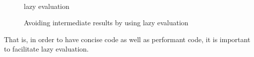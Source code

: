\documentclass[12pt,a4paper,oneside,openright]{book}
\newcommand{\Ie}{That is, }
\begin{document}
\begin{CJK}{UTF8}{}
\begin{figure}[htbp]
\begin{center}
\begin{minipage}[t]{.336940298507463\textwidth}
     \end{minipage}
     \hspace{1cm}
     \begin{minipage}[t]{.263059701492537\textwidth} %
       \begin{center}
         \\
         lazy evaluation
       \end{center}
     \end{minipage}
     \caption{Avoiding intermediate results by using lazy evaluation\label{fig:intermediate}}
   \end{center}
\end{figure}
\Ie in order to have concise code as well as performant code, it is important to facilitate lazy evaluation.


\end{CJK}
\end{document}
